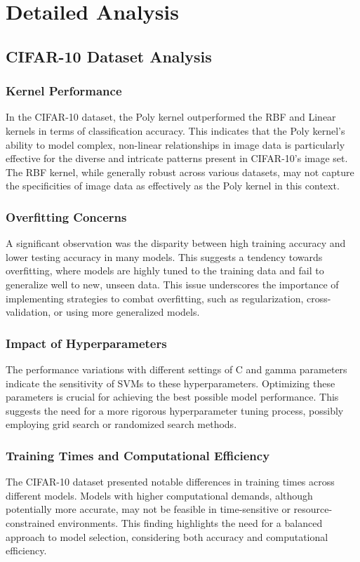\documentclass[conference]{IEEEtran}
\begin{document}
\section{Detailed Analysis}

\subsection{CIFAR-10 Dataset Analysis}

\subsubsection{Kernel Performance}
In the CIFAR-10 dataset, the Poly kernel outperformed the RBF and Linear kernels in terms of classification accuracy. This indicates that the Poly kernel's ability to model complex, non-linear relationships in image data is particularly effective for the diverse and intricate patterns present in CIFAR-10's image set. The RBF kernel, while generally robust across various datasets, may not capture the specificities of image data as effectively as the Poly kernel in this context.

\subsubsection{Overfitting Concerns}
A significant observation was the disparity between high training accuracy and lower testing accuracy in many models. This suggests a tendency towards overfitting, where models are highly tuned to the training data and fail to generalize well to new, unseen data. This issue underscores the importance of implementing strategies to combat overfitting, such as regularization, cross-validation, or using more generalized models.

\subsubsection{Impact of Hyperparameters}
The performance variations with different settings of C and gamma parameters indicate the sensitivity of SVMs to these hyperparameters. Optimizing these parameters is crucial for achieving the best possible model performance. This suggests the need for a more rigorous hyperparameter tuning process, possibly employing grid search or randomized search methods.

\subsubsection{Training Times and Computational Efficiency}
The CIFAR-10 dataset presented notable differences in training times across different models. Models with higher computational demands, although potentially more accurate, may not be feasible in time-sensitive or resource-constrained environments. This finding highlights the need for a balanced approach to model selection, considering both accuracy and computational efficiency.
\end{document}
